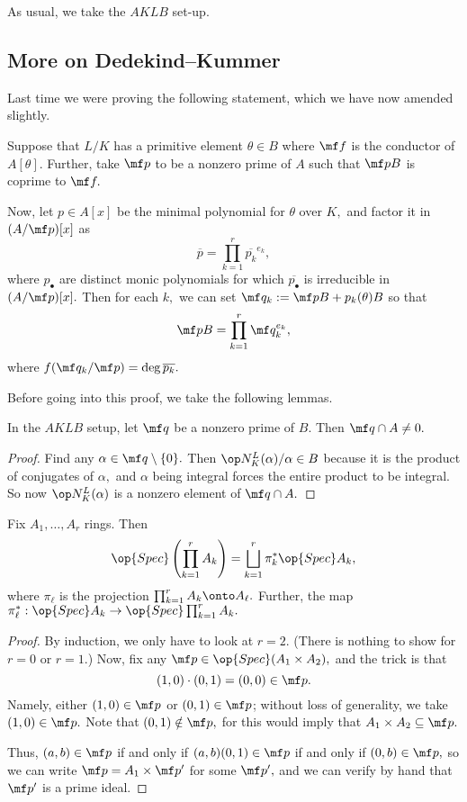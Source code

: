 














As usual, we take the $AKLB$ set-up.

\subsection{More on Dedekind--Kummer}
Last time we were proving the following statement, which we have now amended slightly.
\begin{theorem} \label{thm:dk}
	Suppose that $L/K$ has a primitive element $\theta\in B$ where $\mf f$ is the conductor of $A[\theta].$ Further, take $\mf p$ to be a nonzero prime of $A$ such that $\mf pB$ is coprime to $\mf f.$

	Now, let $p\in A[x]$ be the minimal polynomial for $\theta$ over $K,$ and factor it in $(A/\mf p)[x]$ as
	\[\overline p=\prod_{k=1}^r\overline{p_k}^{e_k},\]
	where $p_\bullet$ are distinct monic polynomials for which $\overline{p_\bullet}$ is irreducible in $(A/\mf p)[x].$ Then for each $k,$ we can set $\mf q_k:=\mf pB+p_k(\theta)B$ so that
	\[\mf pB=\prod_{k=1}^r\mf q_k^{e_k},\]
	where $f(\mf q_k/\mf p)=\deg\overline{p_k}.$
\end{theorem}
Before going into this proof, we take the following lemmas.
\begin{lemma}
	In the $AKLB$ setup, let $\mf q$ be a nonzero prime of $B.$ Then $\mf q\cap A\ne0.$
\end{lemma}
\begin{proof}
	Find any $\alpha\in\mf q\setminus\{0\}.$ Then $\op N_K^L(\alpha)/\alpha\in B$ because it is the product of conjugates of $\alpha,$ and $\alpha$ being integral forces the entire product to be integral. So now $\op N_K^L(\alpha)$ is a nonzero element of $\mf q\cap A.$
\end{proof}
\begin{lemma} \label{lem:specprod}
	Fix $A_1,\ldots,A_r$ rings. Then
	\[\op{Spec}\left(\prod_{k=1}^rA_k\right)=\bigsqcup_{k=1}^r\pi_k^*\op{Spec}A_k,\]
	where $\pi_\ell$ is the projection $\prod_{k=1}^rA_k\onto A_\ell.$ Further, the map $\pi_\ell^*:\op{Spec}A_k\to\op{Spec}\prod_{k=1}^rA_k.$
\end{lemma}
\begin{proof}
	By induction, we only have to look at $r=2.$ (There is nothing to show for $r=0$ or $r=1.$) Now, fix any $\mf p\in\op{Spec}(A_1\times A_2),$ and the trick is that
	\[(1,0)\cdot(0,1)=(0,0)\in\mf p.\]
	Namely, either $(1,0)\in\mf p$ or $(0,1)\in\mf p$; without loss of generality, we take $(1,0)\in\mf p.$ Note that $(0,1)\notin\mf p,$ for this would imply that $A_1\times A_2\subseteq\mf p.$
	
	Thus, $(a,b)\in\mf p$ if and only if $(a,b)(0,1)\in\mf p$ if and only if $(0,b)\in\mf p,$ so we can write $\mf p=A_1\times\mf p'$ for some $\mf p',$ and we can verify by hand that $\mf p'$ is a prime ideal.
\end{proof}
